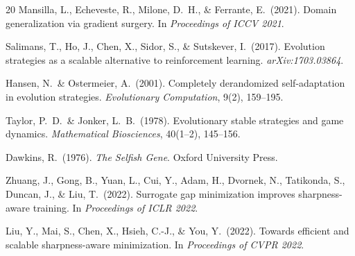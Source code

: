 \documentclass[12pt]{article}
\begin{document}
\begin{thebibliography}{20}
Mansilla, L., Echeveste, R., Milone, D.~H., \& Ferrante, E.\ (2021).
Domain generalization via gradient surgery.
In \textit{Proceedings of ICCV 2021}.

Salimans, T., Ho, J., Chen, X., Sidor, S., \& Sutskever, I.\ (2017).
Evolution strategies as a scalable alternative to reinforcement learning.
\textit{arXiv:1703.03864}.

Hansen, N.\ \& Ostermeier, A.\ (2001).
Completely derandomized self-adaptation in evolution strategies.
\textit{Evolutionary Computation}, 9(2), 159--195.

Taylor, P.~D.\ \& Jonker, L.~B.\ (1978).
Evolutionary stable strategies and game dynamics.
\textit{Mathematical Biosciences}, 40(1--2), 145--156.

Dawkins, R.\ (1976).
\textit{The Selfish Gene}.
Oxford University Press.

Zhuang, J., Gong, B., Yuan, L., Cui, Y., Adam, H., Dvornek, N.,
Tatikonda, S., Duncan, J., \& Liu, T.\ (2022).
Surrogate gap minimization improves sharpness-aware training.
In \textit{Proceedings of ICLR 2022}.

Liu, Y., Mai, S., Chen, X., Hsieh, C.-J., \& You, Y.\ (2022).
Towards efficient and scalable sharpness-aware minimization.
In \textit{Proceedings of CVPR 2022}.

\end{thebibliography}
\end{document}
